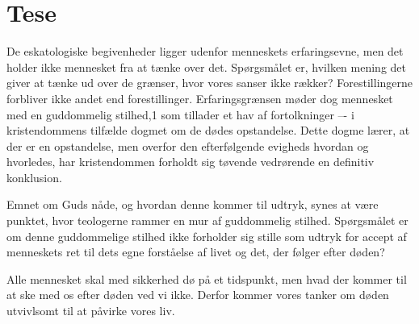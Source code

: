 \chapter{Tese}
De eskatologiske begivenheder ligger udenfor menneskets erfaringsevne, men det holder ikke mennesket fra at tænke over det. Spørgsmålet er, hvilken mening det giver at tænke ud over de grænser, hvor vores sanser ikke rækker? Forestillingerne forbliver ikke andet end forestillinger. Erfaringsgrænsen møder dog mennesket med en guddommelig stilhed,1 som tillader et hav af fortolkninger –- i kristendommens tilfælde dogmet om de dødes opstandelse. Dette dogme lærer, at der er en opstandelse, men overfor den efterfølgende evigheds hvordan og hvorledes, har kristendommen forholdt sig tøvende vedrørende en definitiv konklusion. 

Emnet om Guds nåde, og hvordan denne kommer til udtryk, synes at være punktet, hvor teologerne rammer en mur af guddommelig stilhed. Spørgsmålet er om denne guddommelige stilhed ikke forholder sig stille som udtryk for accept af menneskets ret til dets egne forståelse af livet og det, der følger efter døden?

Alle mennesket skal med sikkerhed dø på et tidspunkt, men hvad der kommer til at ske med os efter døden ved vi ikke. Derfor kommer vores tanker om døden utvivlsomt til at påvirke vores liv.